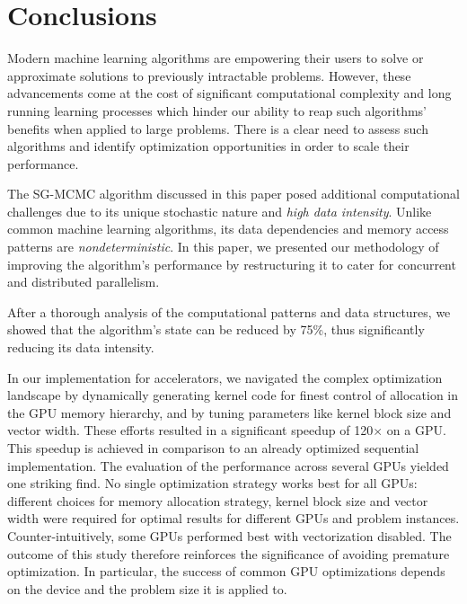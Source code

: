 \section{Conclusions}
\label{sec-conclusion}

Modern machine learning algorithms are empowering their
users to solve or approximate solutions to previously intractable problems.
However, these advancements come at the cost of significant computational
complexity and long running learning processes which hinder our ability to reap
such algorithms' benefits when applied to large problems. There is a clear need
to assess such algorithms and identify optimization opportunities in order to
scale their performance.

The SG-MCMC algorithm discussed in this paper posed additional computational
challenges due to its unique stochastic nature and \emph{high data intensity}. Unlike
common machine learning algorithms, its data dependencies and memory access
patterns are \emph{nondeterministic}. In this paper, we presented our methodology of
improving the algorithm's performance by restructuring it to
cater for concurrent and distributed parallelism.

After a thorough
analysis of the computational patterns and data structures,
we showed that the algorithm's state can be reduced by 75\%,
thus significantly
reducing its data intensity.

In our implementation for accelerators, we navigated the complex optimization
landscape by dynamically generating kernel code for finest control of allocation in
the GPU memory hierarchy, and by tuning parameters like kernel block size and vector
width. These efforts resulted in
a significant speedup of 120$\times$ on a GPU.
This speedup is achieved in comparison to an already
optimized sequential implementation. The evaluation of the performance
across several GPUs yielded one striking find. No single optimization strategy
works best for all GPUs: different choices for memory allocation strategy,
kernel block size and vector width were required for optimal results for
different GPUs and problem instances. Counter-intuitively, some GPUs performed
best with vectorization disabled.
%
The outcome of this study therefore reinforces the significance of avoiding premature
optimization. In particular, the success
of common GPU optimizations depends on the device and the
problem size it is applied to.

